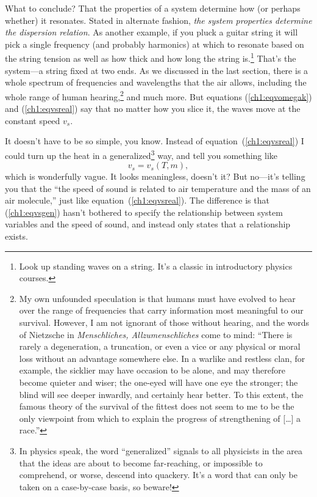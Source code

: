What to conclude? That the properties of a system determine how (or perhaps
whether) it resonates. Stated in alternate fashion, \emph{the system properties
  determine the dispersion relation}.  As another example, if you pluck a guitar
string it will pick a single frequency (and probably harmonics) at which to
resonate based on the string tension as well as how thick and how long the
string is.\footnote{Look up standing waves on a string. It's a classic in
  introductory physics courses.} That's the system---a string fixed at two
ends. As we discussed in the last section, there is a whole spectrum of
frequencies and wavelengths that the air allows, including the whole range of
human hearing,\footnote{My own unfounded speculation is that humans must have
  evolved to hear over the range of frequencies that carry information most
  meaningful to our survival. However, I am not ignorant of those without
  hearing, and the words of Nietzsche in \textit{Menschliches,
    Allzumenschliches} come to mind: ``There is rarely a degeneration, a
  truncation, or even a vice or any physical or moral loss without an advantage
  somewhere else. In a warlike and restless clan, for example, the sicklier may
  have occasion to be alone, and may therefore become quieter and wiser; the
  one-eyed will have one eye the stronger; the blind will see deeper inwardly,
  and certainly hear better. To this extent, the famous theory of the survival
  of the fittest does not seem to me to be the only viewpoint from which to
  explain the progress of strengthening of [\dots] a race.''} and much more. But
equations (\ref{ch1:eqvomegak}) and (\ref{ch1:eqvsreal}) say that no matter how
you slice it, the waves move at the constant speed $v_s$.

It doesn't have to be so simple, you know. Instead of
equation~(\ref{ch1:eqvsreal}) I could turn up the heat in a
generalized\footnote{In physics speak, the word ``generalized'' signals to all
  physicists in the area that the ideas are about to become far-reaching, or
  impossible to comprehend, or worse, descend into quackery. It's a word that
  can only be taken on a case-by-case basis, so beware!}  way, and tell you
something like
\begin{equation}
  \label{ch1:eqvsgen}
  v_s = v_s (T, m),
\end{equation}
which is wonderfully vague. It looks meaningless, doesn't it? But no---it's
telling you that the ``the speed of sound is related to air temperature and the
mass of an air molecule,'' just like equation~(\ref{ch1:eqvsreal}). The
difference is that (\ref{ch1:eqvsgen}) hasn't bothered to specify the
relationship between system variables and the speed of sound, and instead only
states that a relationship exists.

